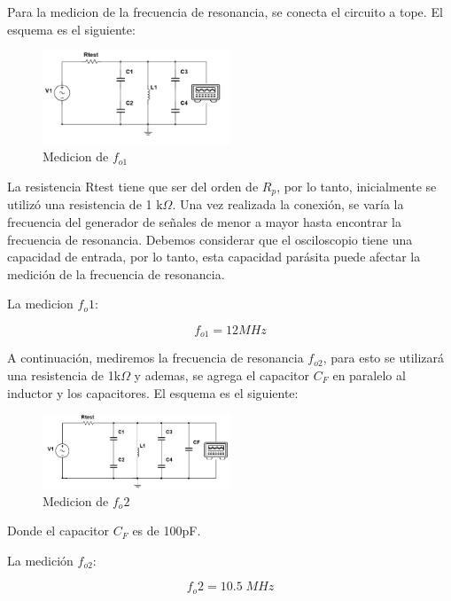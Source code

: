 Para la medicion de la frecuencia de resonancia, se conecta el circuito a tope. El esquema es el siguiente:

\begin{figure}[H]
    \centering
    \includegraphics[width=0.5\textwidth]{Imagenes/medicion_fo.png}
    \caption{Medicion de $f_{o1}$}

\end{figure}


La resistencia Rtest tiene que ser del orden de  $R_p$, por lo tanto, inicialmente se utilizó una resistencia de 1 k$\Omega$. Una vez realizada la conexión, se varía la frecuencia del generador 
de señales de menor a mayor hasta encontrar la frecuencia de resonancia. Debemos considerar que el osciloscopio tiene una capacidad de entrada, por lo tanto, esta capacidad parásita puede 
afectar la medición de la frecuencia de resonancia.

La medicion $f_o1$:

\begin{equation}
    \boxed{f_{o1} = 12 MHz}
\end{equation}

A continuación, mediremos la frecuencia de resonancia $f_{o2}$, para esto se utilizará una resistencia de 1k$\Omega$ y ademas, se agrega el capacitor $C_F$ en paralelo al inductor y los capacitores.
El esquema es el siguiente:

\begin{figure}[H]
    \centering
    \includegraphics[width=0.5\textwidth]{Imagenes/medicion_fo2.png}
    \caption{Medicion de $f_o2$}
\end{figure}

Donde el capacitor $C_F$ es de 100pF.

La medición $f_{o2}$:

\begin{equation}
    \boxed{f_o2 = 10.5\; MHz}
\end{equation}

